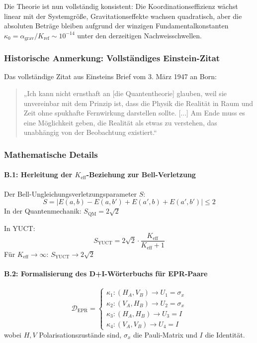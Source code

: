 \documentclass[11pt,a4paper]{article}
\begin{document}
	Die Theorie ist nun vollständig konsistent: Die Koordinationseffizienz wächst linear mit der Systemgröße, Gravitationseffekte wachsen quadratisch, aber die absoluten Beträge bleiben aufgrund der winzigen Fundamentalkonstanten $\kappa_0 = \alpha_{\text{grav}}/K_{\text{ref}} \sim 10^{-14}$ unter den derzeitigen Nachweisschwellen.
	\subsubsection*{Historische Anmerkung: Vollständiges Einstein-Zitat}
	Das vollständige Zitat aus Einsteins Brief vom 3. März 1947 an Born:
	
	\begin{quote}
		„Ich kann nicht ernsthaft an [die Quantentheorie] glauben, weil sie unvereinbar mit dem Prinzip ist, dass die Physik die Realität in Raum und Zeit ohne spukhafte Fernwirkung darstellen sollte. [...] Am Ende muss es eine Möglichkeit geben, die Realität als etwas zu verstehen, das unabhängig von der Beobachtung existiert.“
	\end{quote}
	
	\subsubsection*{Mathematische Details}
	
	\paragraph{B.1: Herleitung der $K_{\mathrm{eff}}$-Beziehung zur Bell-Verletzung}
	Der Bell-Ungleichungsverletzungsparameter $S$:
	\begin{equation}
		S = |E(a,b) - E(a,b') + E(a',b) + E(a',b')| \leq 2
	\end{equation}
	In der Quantenmechanik: $S_{\text{QM}} = 2\sqrt{2}$
	
	In YUCT:
	\begin{equation}
		S_{\text{YUCT}} = 2\sqrt{2} \cdot \frac{K_{\mathrm{eff}}}{K_{\mathrm{eff}} + 1}
	\end{equation}
	Für $K_{\mathrm{eff}} \to \infty$: $S_{\text{YUCT}} \to 2\sqrt{2}$
	\paragraph{B.2: Formalisierung des \protect\mbox{D+I}-Wörterbuchs für EPR-Paare}
	\begin{equation}
		\mathcal{D}_{\text{EPR}} = 
		\begin{cases}
			\kappa_1: (H_A, V_B) \to U_1 = \sigma_x \\
			\kappa_2: (V_A, H_B) \to U_2 = \sigma_x \\
			\kappa_3: (H_A, H_B) \to U_3 = I \\
			\kappa_4: (V_A, V_B) \to U_4 = I
		\end{cases}
	\end{equation}
	wobei $H,V$ Polarisationszustände sind, $\sigma_x$ die Pauli-Matrix und $I$ die Identität.
	
\end{document}

